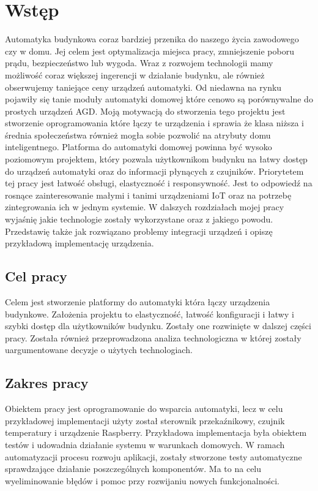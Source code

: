 \chapter{Wstęp}
Automatyka budynkowa coraz bardziej przenika do naszego życia zawodowego czy w domu. Jej celem jest optymalizacja miejsca pracy, zmniejszenie poboru prądu, bezpieczeństwo lub wygoda. Wraz z rozwojem technologii mamy możliwość coraz większej ingerencji w działanie budynku, ale również obserwujemy taniejące ceny urządzeń automatyki. Od niedawna na rynku pojawiły się tanie moduły automatyki domowej które cenowo są porównywalne do prostych urządzeń AGD. Moją motywacją do stworzenia tego projektu jest stworzenie oprogramowania które łączy te urządzenia i sprawia że klasa niższa i średnia społeczeństwa również mogła sobie pozwolić na atrybuty domu inteligentnego.
Platforma do automatyki domowej powinna być wysoko poziomowym projektem, który pozwala użytkownikom budynku na łatwy dostęp do urządzeń automatyki oraz do informacji płynących z czujników. Priorytetem tej pracy jest łatwość obsługi, elastyczność i responsywność. Jest to odpowiedź na rosnące zainteresowanie małymi i tanimi urządzeniami IoT oraz na potrzebę zintegrowania ich w jednym systemie. W dalszych rozdziałach mojej pracy wyjaśnię jakie technologie zostały wykorzystane oraz z jakiego powodu.  Przedstawię także jak rozwiązano problemy integracji urządzeń i opiszę przykładową implementację urządzenia.
\section{Cel pracy}
    Celem jest stworzenie platformy do automatyki która łączy urządzenia budynkowe. Założenia projektu to elastyczność, łatwość konfiguracji i łatwy i szybki dostęp dla użytkowników budynku. Zostały one rozwinięte w dalszej części pracy. \newline
    Została również przeprowadzona analiza technologiczna w której zostały uargumentowane decyzje o użytych technologiach. 
\section{Zakres pracy}
Obiektem pracy jest oprogramowanie do wsparcia automatyki, lecz w celu przykładowej implementacji użyty został sterownik przekaźnikowy, czujnik temperatury i urządzenie Raspberry. Przykładowa implementacja była obiektem testów i udowadnia działanie systemu w warunkach domowych. W ramach automatyzacji procesu rozwoju aplikacji, zostały stworzone testy automatyczne sprawdzające działanie poszczególnych komponentów. Ma to na celu wyeliminowanie błędów i pomoc przy rozwijaniu nowych funkcjonalności.
